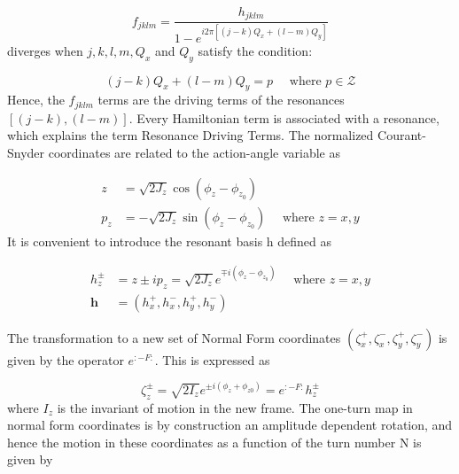 \begin{equation}
    f_{jklm} = \frac{h_{jklm}}{1 - e^{i 2 \pi \left[(j-k) Q_{x} + (l-m) Q_{y} \right]}}
    \label{equation:f_rdts}
\end{equation}
 diverges when \(j, k, l, m, Q_x\) and \(Q_y\) satisfy the condition:

\begin{equation}
    (j-k) Q_{x} + (l-m) Q_{y} = p \quad \text{ where } p \in \mathcal{Z}
    \label{equation:resonance_condition}
\end{equation}
Hence, the \(f_{jklm}\) terms are the driving terms of the resonances \([(j-k),(l-m)]\).
Every Hamiltonian term is associated with a resonance, which explains the term Resonance Driving Terms.
The normalized Courant-Snyder coordinates are related to the action-angle variable as

\begin{equation}
    \begin{aligned}
    z &= \sqrt{2 J_{z}} \cos (\phi_{z} - \phi_{z_{0}}) \\
    p_{z} &= -\sqrt{2 J_{z}} \sin (\phi_{z} - \phi_{z_{0}}) \quad \text { where } z=x, y
    \end{aligned}
    \label{equation:courant_snyder_to_action_angle}
\end{equation}
It is convenient to introduce the resonant basis h defined as

\begin{equation}
    \begin{aligned}
    h_{z}^{\pm} &= z \pm i p_{z} = \sqrt{2 J_{z}} e^{\mp i \left(\phi_{z}-\phi_{z_{0}}\right)} \quad \text { where } z=x, y \\
    \mathbf{h} &= \left( h_{x}^{+}, h_{x}^{-}, h_{y}^{+}, h_{y}^{-} \right)
    \end{aligned}
    \label{equation:resonant_basis_h}
\end{equation}

The transformation to a new set of Normal Form coordinates \(\left(\zeta_{x}^{+}, \zeta_{x}^{-}, \zeta_{y}^{+}, \zeta_{y}^{-}\right)\) is given by the operator \(e^{: -F :}\).
This is expressed as

\begin{equation}
    \zeta_{z}^{\pm} = \sqrt{2 I_{z}} e^{\pm i \left(\phi_{z}+\phi_{z 0} \right)} = e^{:-F:} h_{z}^{\pm}
    \label{equation:action_angle_to_normal_form}
\end{equation}
where \(I_{z}\) is the invariant of motion in the new frame.
The one-turn map in normal form coordinates is by construction an amplitude dependent rotation, and hence the motion in these coordinates as a function of the turn number N is given by

